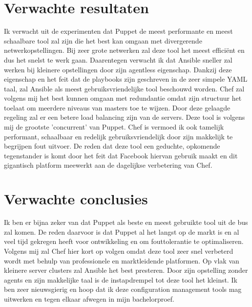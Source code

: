 \documentclass[fleqn,10pt]{voorstel}
\begin{document}
\section{Verwachte resultaten}
\label{sec:verwachte_resultaten}

Ik verwacht uit de experimenten dat Puppet de meest performante en meest schaalbare tool zal zijn die het best kan omgaan met divergerende netwerkopstellingen. Bij zeer grote netwerken zal deze tool het meest efficiënt en dus het snelst te werk gaan. Daarentegen verwacht ik dat Ansible sneller zal werken bij kleinere opstellingen door zijn agentless eigenschap. Dankzij deze eigenschap en het feit dat de playbooks zijn geschreven in de zeer simpele YAML taal, zal Ansible als meest gebruiksvriendelijke tool beschouwd worden. Chef zal volgens mij het best kunnen omgaan met redundantie omdat zijn structuur het toelaat om meerdere niveaus van masters toe te wijzen. Door deze gelaagde regeling zal er een betere load balancing zijn van de servers. Deze tool is volgens mij de grootste 'concurrent' van Puppet. Chef is vermoed ik ook tamelijk performant, schaalbaar en redelijk gebruiksvriendelijk door zijn makkelijk te begrijpen fout uitvoer. De reden dat deze tool een geduchte, opkomende tegenstander is komt door het feit dat Facebook hiervan gebruik maakt en dit gigantisch platform meewerkt aan de dagelijkse verbetering van Chef. 

\section{Verwachte conclusies}
\label{sec:verwachte_conclusies}

Ik ben er bijna zeker van dat Puppet als beste en meest gebruikte tool uit de bus zal komen. De reden daarvoor is dat Puppet al het langst op de markt is en al veel tijd gekregen heeft voor ontwikkeling en om fouttolerantie te optimaliseren. Volgens mij zal Chef hier kort op volgen omdat deze tool zeer snel verbeterd wordt met behulp van professionele en marktleidende platformen. Op vlak van kleinere server clusters zal Ansible het best presteren. Door zijn opstelling zonder agents en zijn makkelijke taal is de instapdrempel tot deze tool het kleinst. Ik ben zeer nieuwsgierig en hoop dat ik deze configuration management tools mag uitwerken en tegen elkaar afwegen in mijn bachelorproef.


\printbibliography[heading=bibintoc]
\end{document}
